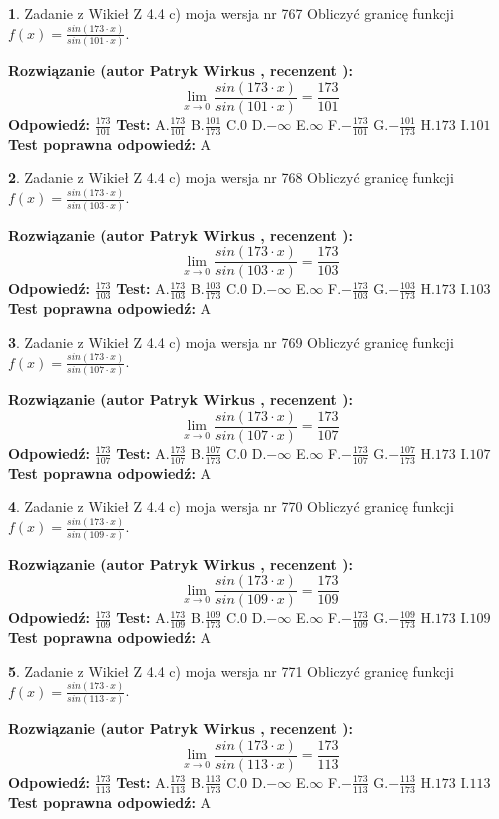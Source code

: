 \documentclass[12pt, a4paper]{article}
\theoremstyle{definition} %
\newtheorem{zad}{}
\newcommand{\zadStart}[1]{\begin{zad}#1\newline}
\newcommand{\zadStop}{\end{zad}}
\newcommand{\rozwStart}[2]{\noindent \textbf{Rozwiązanie (autor #1 , recenzent #2): }\newline}
\newcommand{\rozwStop}{\newline}
\newcommand{\odpStart}{\noindent \textbf{Odpowiedź:}\newline}
\newcommand{\odpStop}{\newline}
\newcommand{\testStart}{\noindent \textbf{Test:}\newline}
\newcommand{\testStop}{\newline}
\newcommand{\kluczStart}{\noindent \textbf{Test poprawna odpowiedź:}\newline}
\newcommand{\kluczStop}{\newline}
\begin{document}
\zadStart{Zadanie z Wikieł Z 4.4 c) moja wersja nr 767}
Obliczyć granicę funkcji $f(x)=\frac{sin(173\cdot x)}{sin(101\cdot x)}$.
\zadStop
\rozwStart{Patryk Wirkus}{}
$$\lim\limits_{x\to 0}\frac{sin(173\cdot x)}{sin(101\cdot x)}=
\frac{173}{101}$$
\rozwStop
\odpStart
$\frac{173}{101}$
\odpStop
\testStart
A.$\frac{173}{101}$
B.$\frac{101}{173}$
C.$0$
D.$-\infty$
E.$\infty$
F.$-\frac{173}{101}$
G.$-\frac{101}{173}$
H.$173$
I.$101$
\testStop
\kluczStart
A
\kluczStop



\zadStart{Zadanie z Wikieł Z 4.4 c) moja wersja nr 768}
Obliczyć granicę funkcji $f(x)=\frac{sin(173\cdot x)}{sin(103\cdot x)}$.
\zadStop
\rozwStart{Patryk Wirkus}{}
$$\lim\limits_{x\to 0}\frac{sin(173\cdot x)}{sin(103\cdot x)}=
\frac{173}{103}$$
\rozwStop
\odpStart
$\frac{173}{103}$
\odpStop
\testStart
A.$\frac{173}{103}$
B.$\frac{103}{173}$
C.$0$
D.$-\infty$
E.$\infty$
F.$-\frac{173}{103}$
G.$-\frac{103}{173}$
H.$173$
I.$103$
\testStop
\kluczStart
A
\kluczStop



\zadStart{Zadanie z Wikieł Z 4.4 c) moja wersja nr 769}
Obliczyć granicę funkcji $f(x)=\frac{sin(173\cdot x)}{sin(107\cdot x)}$.
\zadStop
\rozwStart{Patryk Wirkus}{}
$$\lim\limits_{x\to 0}\frac{sin(173\cdot x)}{sin(107\cdot x)}=
\frac{173}{107}$$
\rozwStop
\odpStart
$\frac{173}{107}$
\odpStop
\testStart
A.$\frac{173}{107}$
B.$\frac{107}{173}$
C.$0$
D.$-\infty$
E.$\infty$
F.$-\frac{173}{107}$
G.$-\frac{107}{173}$
H.$173$
I.$107$
\testStop
\kluczStart
A
\kluczStop



\zadStart{Zadanie z Wikieł Z 4.4 c) moja wersja nr 770}
Obliczyć granicę funkcji $f(x)=\frac{sin(173\cdot x)}{sin(109\cdot x)}$.
\zadStop
\rozwStart{Patryk Wirkus}{}
$$\lim\limits_{x\to 0}\frac{sin(173\cdot x)}{sin(109\cdot x)}=
\frac{173}{109}$$
\rozwStop
\odpStart
$\frac{173}{109}$
\odpStop
\testStart
A.$\frac{173}{109}$
B.$\frac{109}{173}$
C.$0$
D.$-\infty$
E.$\infty$
F.$-\frac{173}{109}$
G.$-\frac{109}{173}$
H.$173$
I.$109$
\testStop
\kluczStart
A
\kluczStop



\zadStart{Zadanie z Wikieł Z 4.4 c) moja wersja nr 771}
Obliczyć granicę funkcji $f(x)=\frac{sin(173\cdot x)}{sin(113\cdot x)}$.
\zadStop
\rozwStart{Patryk Wirkus}{}
$$\lim\limits_{x\to 0}\frac{sin(173\cdot x)}{sin(113\cdot x)}=
\frac{173}{113}$$
\rozwStop
\odpStart
$\frac{173}{113}$
\odpStop
\testStart
A.$\frac{173}{113}$
B.$\frac{113}{173}$
C.$0$
D.$-\infty$
E.$\infty$
F.$-\frac{173}{113}$
G.$-\frac{113}{173}$
H.$173$
I.$113$
\testStop
\kluczStart
A
\kluczStop
\end{document}
